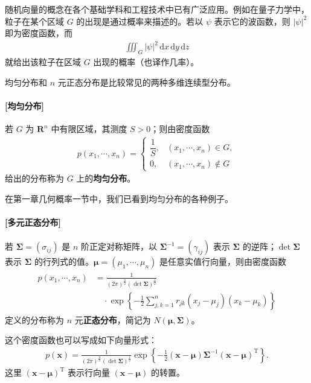 \documentclass[../../main.tex]{subfiles}
\begin{document}
随机向量的概念在各个基础学科和工程技术中已有广泛应用。例如在量子力学中，粒子在某个区域 $G$ 的出现是通过概率来描述的。若以 $\psi$ 表示它的波函数，则 $|\psi|^{2}$ 即为密度函数，而
\begin{align*}\iiint_{G}|\psi|^{2}\,\mathrm{d}x\,\mathrm{d}y\,\mathrm{d}z\end{align*}
就给出该粒子在区域 $G$ 出现的概率（也译作几率）。

均匀分布和 $n$ 元正态分布是比较常见的两种多维连续型分布。

\paragraph{[均匀分布]}若 $G$ 为 $\mathbf{R}^{n}$ 中有限区域，其测度 $S>0$；则由密度函数
\begin{align}
p(x_1,\cdots,x_n)=
\begin{cases}
\dfrac{1}{S}, & (x_1,\cdots,x_n)\in G,\\[4pt]
0, & (x_1,\cdots,x_n)\notin G
\end{cases}\label{align:ch03-多元均匀}
\end{align}
给出的分布称为 $G$ 上的\textbf{均匀分布}。

在第一章几何概率一节中，我们已看到均匀分布的各种例子。

\paragraph{[多元正态分布]}若 $\boldsymbol{\Sigma}=(\sigma_{ij})$ 是 $n$ 阶正定对称矩阵，以 $\boldsymbol{\Sigma}^{-1}=(\gamma_{ij})$ 表示 $\boldsymbol{\Sigma}$ 的逆阵；$\det\boldsymbol{\Sigma}$ 表示 $\boldsymbol{\Sigma}$ 的行列式的值。$\boldsymbol{\mu}=(\mu_1,\cdots,\mu_n)$ 是任意实值行向量，则由密度函数
\begin{align}
\begin{aligned}
p(x_1,\cdots,x_n)
&=\frac{1}{(2\pi)^{\frac{n}{2}}(\det\boldsymbol{\Sigma})^{\frac{1}{2}}}\\
&\quad\cdot\exp\left\{-\frac{1}{2}\sum_{j,k=1}^{n}r_{jk}(x_j-\mu_j)(x_k-\mu_k)\right\}
\end{aligned}\label{align:ch03-多元正态}
\end{align}
定义的分布称为 $n$ 元\textbf{正态分布}，简记为 $N(\boldsymbol{\mu},\boldsymbol{\Sigma})$。

这个密度函数也可以写成如下向量形式：
\begin{align}
p(\boldsymbol{x})=\frac{1}{(2\pi)^{\frac{n}{2}}(\det\boldsymbol{\Sigma})^{\frac{1}{2}}}\exp\left\{-\frac{1}{2}(\boldsymbol{x}-\boldsymbol{\mu})\boldsymbol{\Sigma}^{-1}(\boldsymbol{x}-\boldsymbol{\mu})^{\mathrm{T}}\right\}.\label{align:ch03-多元正态向量}
\end{align}
这里 $(\boldsymbol{x}-\boldsymbol{\mu})^{\mathrm{T}}$ 表示行向量 $(\boldsymbol{x}-\boldsymbol{\mu})$ 的转置。
\end{document}
